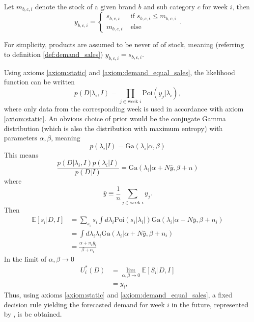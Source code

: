 \begin{definition}
	\label{def:demand_sales}
	Let $m_{b,c,i}$ denote the stock of a given brand $b$ and sub category $c$ for week $i$, then
	\begin{equation}
		y_{b,c,i} = \begin{cases}
			s_{b,c,i} & \text{ if } s_{b,c,i}\leq m_{b,c,i}\\
			m_{b,c,i} & \text{ else }
		\end{cases}.
	\end{equation}
\end{definition}

\begin{axiom}
	\label{axiom:demand_equal_sales}
	For simplicity, products are assumed to be never of of stock, meaning (referring to definition \ref{def:demand_sales}) $y_{b,c,i} = s_{b,c,i}$.
\end{axiom}

Using axioms \ref{axiom:static} and \ref{axiom:demand_equal_sales}, the likelihood function can be written
\begin{equation}
	p(D|\lambda_i,I) = \prod_{j\in \text{week }i}\text{Poi}(y_j|\lambda_i),
\end{equation}
where only data from the corresponding week is used in accordance with axiom \ref{axiom:static}. An obvious choice of prior would be the conjugate Gamma distribution (which is also the distribution with maximum entropy) with parameters $\alpha,\beta$, meaning
\begin{equation}
	p(\lambda_i|I) = \text{Ga}(\lambda_i|\alpha,\beta)
\end{equation}
This means
\begin{equation}
	\frac{p(D|\lambda_i,I)p(\lambda_i|I)}{p(D|I)}= \text{Ga}(\lambda_i|\alpha+N\bar{y},\beta +n)
\end{equation}
where
\begin{equation}
	\bar{y} \equiv \frac{1}{n}\sum_{j \in \text{week }i} y_j.
\end{equation}
Then
\begin{equation}
	\begin{split}
		\mathbb{E}[s_i|D,I] &=\sum_{s_i} s_i\int d\lambda_i \text{Poi}(s_i|\lambda_i|)\text{Ga}(\lambda_i|\alpha+N\bar{y},\beta +n_i)\\
		&=\int d\lambda_i \lambda_i\text{Ga}(\lambda_i|\alpha+N\bar{y},\beta +n_i)\\
		& = \frac{\alpha+n_i\bar{y}_i}{\beta+n_i}
	\end{split}
\end{equation}
In the limit of $\alpha,\beta \rightarrow 0$
\begin{equation}
	\begin{split}
		U_i^*(D) &=\lim\limits_{\alpha,\beta \rightarrow 0}\mathbb{E}[S_i|D,I]\\
		& = \bar{y}_i,
	\end{split}
	\label{eq:decision_rule2}
\end{equation}
Thus, using axioms \ref{axiom:static} and \ref{axiom:demand_equal_sales}, a fixed decision rule yielding the forecasted demand for week $i$ in the future, represented by , is be obtained.

